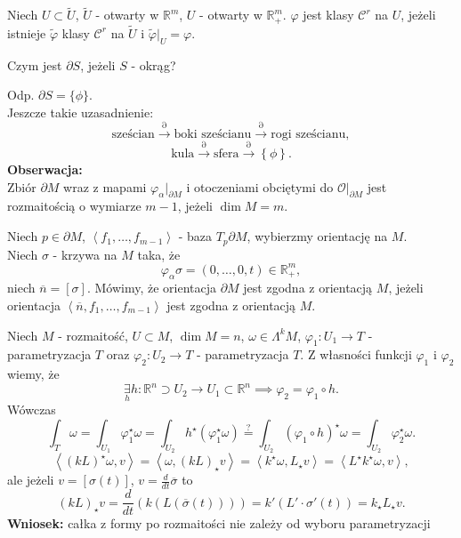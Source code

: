 \documentclass[../main.tex]{subfiles}
\begin{document}
\begin{definicja}
    Niech $U\subset \tilde U$, $\tilde U$ - otwarty w $\mathbb{R}^m$, $U$ - otwarty w $\mathbb{R}^m_+$. $\varphi$ jest klasy $\mathcal{C}^r$ na $U$, jeżeli istnieje $\tilde \varphi$ klasy $\mathcal{C}^r$ na $\tilde U$ i $\tilde \varphi|_U = \varphi$.
\end{definicja}
\begin{pytanie}
    Czym jest $\partial S$, jeżeli $S$ - okrąg?
\end{pytanie}
Odp. $\partial S = \{\phi\}$.\\
Jeszcze takie uzasadnienie:
\[
    \text{sześcian} \overset{\partial}{\to} \text{boki sześcianu} \overset{\partial}{\to} \text{rogi sześcianu}
,\]
\[
    \text{kula} \overset{\partial}{\to} \text{sfera} \overset{\partial}{\to} \left\{ \phi \right\}
.\]
\textbf{Obserwacja:}\\
Zbiór $\partial M$ wraz z mapami $\varphi_\alpha|_{\partial M}$ i otoczeniami obciętymi do $\mathcal{O}|_{\partial M}$ jest rozmaitością o wymiarze $m-1$, jeżeli $\dim M = m$.\\

\pagebreak
\begin{definicja}
Niech  $p\in \partial M$, $\left<f_1,\ldots,f_{m-1} \right>$ - baza $ T_p\partial M$, wybierzmy orientację na $M$.\\
Niech $\sigma$ - krzywa na $M$ taka, że
\[
    \varphi_\alpha\sigma =  \left( 0,\ldots,0,t \right) \in\mathbb{R}^m_+
,\]
niech $\overline{n} = \left[ \sigma \right] $. Mówimy, że orientacja $\partial M$ jest zgodna z orientacją $M$, jeżeli orientacja $\left<\overline{n}, f_1,\ldots,f_{m-1} \right>$ jest zgodna z orientacją $M$.
\end{definicja}

Niech $M$ - rozmaitość, $U\subset M$, $\dim M = n$, $\omega\in \Lambda^kM$,  $\varphi_1: U_1\to T$ - parametryzacja $T$ oraz $\varphi_2: U_2\to T$ - parametryzacja $T$. Z własności funkcji  $\varphi_1$ i $\varphi_2$ wiemy, że
\[
\underset{h}{\exists} h: \mathbb{R}^n \supset U_2\to U_1\subset\mathbb{R}^n \implies \varphi_2 = \varphi_1\circ h
.\]
Wówczas
\[
    \int_{T}\omega = \int_{U_1}\varphi_1^\star \omega = \int_{U_2}h^\star\left( \varphi_1^\star\omega \right) \overset{\text{?}}{=} \int_{U_2}(\varphi_1\circ h)^\star\omega = \int_{U_2}\varphi_2^\star\omega
.\]
    \[
        \left<(kL)^\star\omega, v \right> = \left<\omega, (kL)_\star v \right> = \left<k^\star \omega, L_\star v \right> = \left<L^\star k^\star \omega, v \right>
    ,\]
ale jeżeli $v = \left[ \sigma(t) \right]$, $v = \frac{d}{dt}\overline{\sigma}$ to
\[
    (kL)_\star v = \frac{d}{dt}\left( k\left( L\left( \overline{\sigma}(t) \right)  \right)  \right) = k'(L'\cdot \sigma'(t)) = k_\star L_\star v
.\]
\textbf{Wniosek:} całka z formy po rozmaitości nie zależy od wyboru parametryzacji
\end{document}
